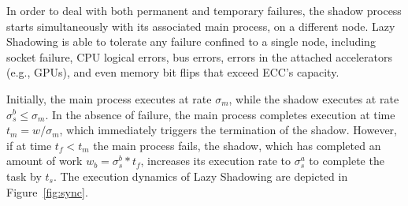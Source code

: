 In order to deal with both permanent and temporary failures, the shadow process starts simultaneously with its associated main process, on a different node. Lazy Shadowing is able to tolerate any failure confined to a single node, including socket failure, CPU logical errors, bus errors, errors in the attached accelerators (e.g., GPUs), and even memory bit flips that exceed ECC's capacity. 

Initially, the main process executes at rate $\sigma_m$, while the shadow executes at rate $\sigma_s^b \le \sigma_m$. %
In the absence of failure, the main process completes execution at time 
$t_m = w/\sigma_m$, which immediately triggers the termination of the
shadow. However, if at time $t_f < t_m$ the main process fails, the shadow, which has completed an amount of work $w_b=\sigma_s^b * t_f$, increases its execution rate to $\sigma_s^a$ to complete the task by $t_s$. %
The execution dynamics of Lazy Shadowing are depicted in Figure~\ref{fig:sync}.

